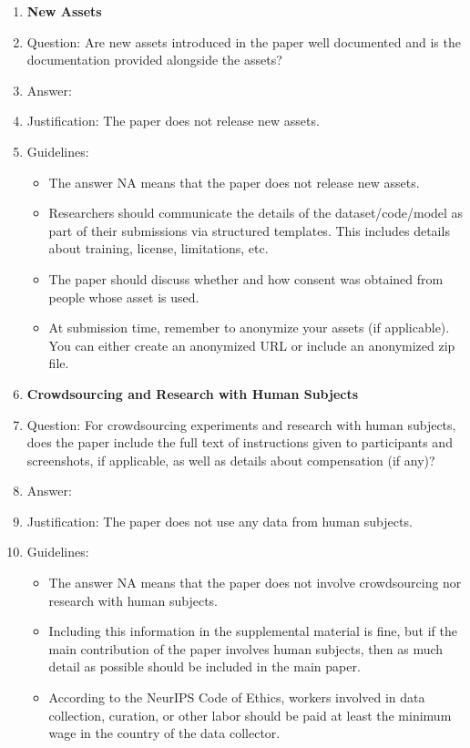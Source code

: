 \documentclass{article} %
\newcounter{ct}
\theoremstyle{definition}
\theoremstyle{remark}
\begin{document}
\begin{enumerate}
\item {\bf New Assets}
    \item[] Question: Are new assets introduced in the paper well documented and is the documentation provided alongside the assets?
    \item[] Answer: \answerNA{} %
    \item[] Justification: The paper does not release new assets.
    \item[] Guidelines:
    \begin{itemize}
        \item The answer NA means that the paper does not release new assets.
        \item Researchers should communicate the details of the dataset/code/model as part of their submissions via structured templates. This includes details about training, license, limitations, etc. 
        \item The paper should discuss whether and how consent was obtained from people whose asset is used.
        \item At submission time, remember to anonymize your assets (if applicable). You can either create an anonymized URL or include an anonymized zip file.
    \end{itemize}

\item {\bf Crowdsourcing and Research with Human Subjects}
    \item[] Question: For crowdsourcing experiments and research with human subjects, does the paper include the full text of instructions given to participants and screenshots, if applicable, as well as details about compensation (if any)? 
    \item[] Answer: \answerNA{} %
    \item[] Justification: The paper does not use any data from human subjects.
    \item[] Guidelines:
    \begin{itemize}
        \item The answer NA means that the paper does not involve crowdsourcing nor research with human subjects.
        \item Including this information in the supplemental material is fine, but if the main contribution of the paper involves human subjects, then as much detail as possible should be included in the main paper. 
        \item According to the NeurIPS Code of Ethics, workers involved in data collection, curation, or other labor should be paid at least the minimum wage in the country of the data collector. 
    \end{itemize}


\end{enumerate}
\end{document}
